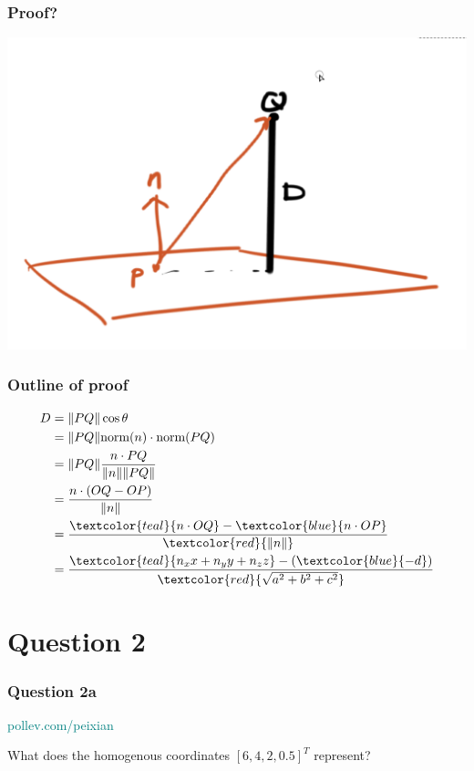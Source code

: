 \documentclass{beamer}
\begin{document}
\begin{frame}
    \frametitle{Proof?}

    \begin{center}
        \includegraphics[scale=0.5]{distance_perp.png}
    \end{center}

\end{frame}

\begin{frame}
    \frametitle{Outline of proof}

    \begin{eqnarray*}
        D &= \|PQ\| \cos \theta \\
        &= \|PQ\| \text{norm}(n) \cdot \text{norm}(PQ) \\
        &= \|PQ\| \frac{n \cdot PQ}{\|n\| \|PQ\|} \\
        &= \frac{n \cdot (OQ - OP)}{\|n\|} \\ 
        &= \frac{\textcolor{teal}{n \cdot OQ} - \textcolor{blue}{n \cdot OP}}{\textcolor{red}{\|n\|}} \\
        &= \frac{\textcolor{teal}{n_x x + n_y y + n_z z} - (\textcolor{blue}{-d})}{\textcolor{red}{\sqrt{a^2 + b^2 + c^2}}}\\
    \end{eqnarray*}

\end{frame}

\section{Question 2}

\begin{frame}
    \frametitle{Question 2a}

    \begin{tcolorbox}[colback=teal!5!white]
        \textcolor{teal}{pollev.com/peixian}
    \end{tcolorbox}

    \vspace{1em}
    
    What does the homogenous coordinates $[6, 4, 2, 0.5]^T$ represent?

\end{frame}
\end{document}
